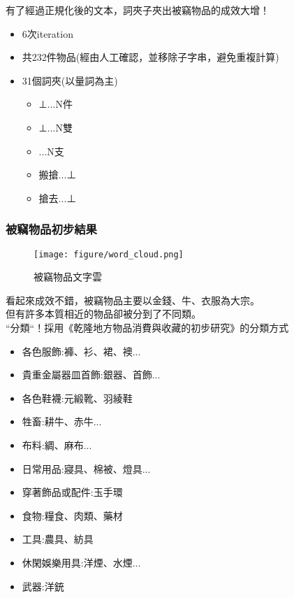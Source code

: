 \documentclass{beamer}
\begin{document}
\begin{frame}
    有了經過正規化後的文本，詞夾子夾出被竊物品的成效大增！
        \begin{itemize}
        \item 6次iteration
        \item 共232件物品(經由人工確認，並移除子字串，避免重複計算)
        \item 31個詞夾(以量詞為主)
        \begin{itemize}
            \item ⊥...N件
            \item ⊥...N雙
            \item ...N支
            \item 搬搶...⊥
            \item 搶去...⊥
        \end{itemize}
        \end{itemize}
\end{frame}

\begin{frame}
\frametitle{被竊物品初步結果}
\begin{figure}[H]
    	\begin{center}
        	\texttt{[image: figure/word\_cloud.png]}
			\caption{被竊物品文字雲}
    	\end{center}
	\end{figure}
\end{frame}

\begin{frame}
    看起來成效不錯，被竊物品主要以金錢、牛、衣服為大宗。\\但有許多本質相近的物品卻被分到了不同類。\\
    \MVRightarrow{}``分類``！採用《乾隆地方物品消費與收藏的初步研究》的分類方式
    \begin{itemize}
        \item 各色服飾:褲、衫、裙、襖...
        \item 貴重金屬器皿首飾:銀器、首飾...
        \item 各色鞋襪:元緞靴、羽綾鞋
        \item 牲畜:耕牛、赤牛...
        \item 布料:綢、麻布...
        \item 日常用品:寢具、棉被、燈具...
        \item 穿著飾品或配件:玉手環
        \item 食物:糧食、肉類、藥材
        \item 工具:農具、紡具
        \item 休閑娛樂用具:洋煙、水煙...
        \item 武器:洋銃
    \end{itemize}
\end{frame}
\end{document}
